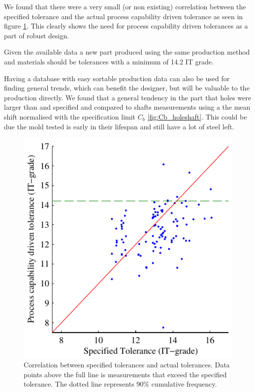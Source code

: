 \documentclass[aip,amsmath, reprint, author-year]{revtex4-1}
\begin{document}
We found that there were a very small (or non existing)  correlation between the specified tolerance and the actual process capability driven tolerance as seen in figure \ref{fig:ITG_ITGSpec}. 
This clearly shows the need for process capability driven tolerances as a part of robust design. 

Given the available data a new part produced using the same production method and materials should be tolerances with a minimum of 14.2 IT grade. 

Having a database with easy sortable production data can also be used for finding general trends, which can benefit the designer, but will be valuable to the production directly. We found that a general tendency in the part that holes were larger than and specified and compared to shafts measurements using a the mean shift normalised with the specification limit $C_b$ \ref{fig:Cb_holeshaft}. This could be due the mold tested is early in their lifespan and still have a lot of steel left. 

\begin{figure}
\includegraphics{ITG_ITGSpec.pdf}
\caption{\label{fig:ITG_ITGSpec} Correlation between specified tolerances and actual tolerances. 
Data points above the full line is measurements that exceed the specified tolerance. 
The dotted line represents 90\% cumulative frequency.}
\end{figure}
\end{document}
